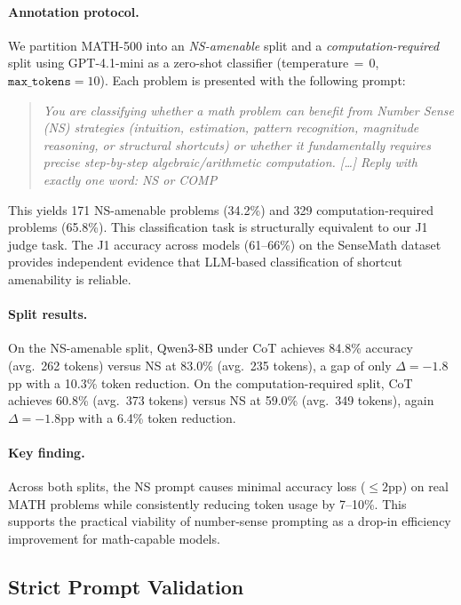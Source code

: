 \paragraph{Annotation protocol.}
We partition MATH-500 into an \emph{NS-amenable} split and a \emph{computation-required} split using GPT-4.1-mini as a zero-shot classifier (temperature$\,{=}\,0$, $\texttt{max\_tokens}{=}10$).
Each problem is presented with the following prompt:
\begin{quote}
\small
\textit{You are classifying whether a math problem can benefit from Number Sense (NS) strategies (intuition, estimation, pattern recognition, magnitude reasoning, or structural shortcuts) or whether it fundamentally requires precise step-by-step algebraic/arithmetic computation. [\ldots] Reply with exactly one word: NS or COMP}
\end{quote}
This yields 171 NS-amenable problems (34.2\%) and 329 computation-required problems (65.8\%).
This classification task is structurally equivalent to our J1 judge task. The J1 accuracy across models (61--66\%) on the SenseMath dataset provides independent evidence that LLM-based classification of shortcut amenability is reliable.

\paragraph{Split results.}
On the NS-amenable split, Qwen3-8B under CoT achieves 84.8\% accuracy (avg.\ 262 tokens) versus NS at 83.0\% (avg.\ 235 tokens), a gap of only $\Delta = {-}1.8$pp with a 10.3\% token reduction.
On the computation-required split, CoT achieves 60.8\% (avg.\ 373 tokens) versus NS at 59.0\% (avg.\ 349 tokens), again $\Delta = {-}1.8$pp with a 6.4\% token reduction.

\paragraph{Key finding.}
Across both splits, the NS prompt causes minimal accuracy loss ($\leq 2$pp) on real MATH problems while consistently reducing token usage by 7--10\%.
This supports the practical viability of number-sense prompting as a drop-in efficiency improvement for math-capable models.

\subsection{Strict Prompt Validation}
\label{sec:strict}

